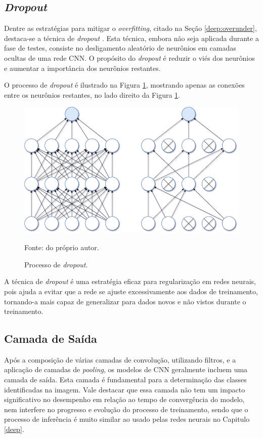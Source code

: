 \subsection{\textit{Dropout}}
\label{cnn:dropout}

Dentre as estratégias para mitigar o \textit{overfitting}, citado na Seção \ref{deep:overunder}, destaca-se a técnica de \textit{dropout} \citep{Goodfellow2016}. Esta técnica, embora não seja aplicada durante a fase de testes, consiste no desligamento aleatório de neurônios em camadas ocultas de uma rede CNN. O propósito do \textit{dropout} é reduzir o viés dos neurônios e aumentar a importância dos neurônios restantes.

O processo de \textit{dropout} é ilustrado na Figura \ref{cnn:fig:9}, mostrando apenas as conexões entre os neurônios restantes, no lado direito da Figura \ref{cnn:fig:9}.

\begin{figure}[H]
    \centering
    \caption{Processo de \textit{dropout}.}
    \includegraphics[width=1\linewidth]{recursos/imagens/deep/dropout.png}
    \label{cnn:fig:9}

     Fonte: do próprio autor.
\end{figure}

A técnica de \textit{dropout} é uma estratégia eficaz para regularização em redes neurais, pois ajuda a evitar que a rede se ajuste excessivamente aos dados de treinamento, tornando-a mais capaz de generalizar para dados novos e não vistos durante o treinamento.

\subsection{Camada de Saída}
\label{cnn:output}
Após a composição de várias camadas de convolução, utilizando filtros, e a aplicação de camadas de \textit{pooling}, os modelos de CNN geralmente incluem uma camada de saída. Esta camada é fundamental para a determinação das classes identificadas na imagem. Vale destacar que essa camada não tem um impacto significativo no desempenho em relação ao tempo de convergência do modelo, nem interfere no progresso e evolução do processo de treinamento, sendo que o processo de inferência é muito similar ao usado pelas redes neurais no Capitulo \ref{deep}.

